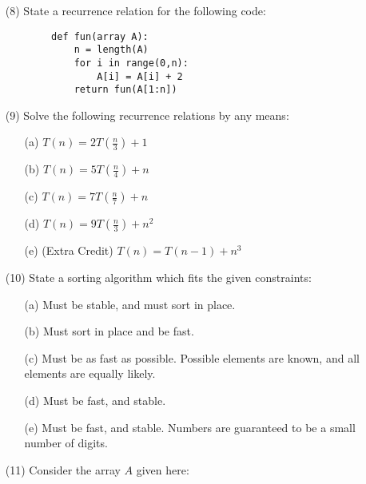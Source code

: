 \documentclass[12pt]{article}
\begin{document}
\begin{enumerate}
\begin{itemize}
        \end{itemize}
    \item[(8)] State a recurrence relation for the following code:
        \begin{lstlisting}
        def fun(array A):
            n = length(A)
            for i in range(0,n):
                A[i] = A[i] + 2
            return fun(A[1:n])
        \end{lstlisting}
    \newpage
    \item[(9)] Solve the following recurrence relations by any means:
    \begin{itemize}
        \item[(a)] $T(n) = 2T(\frac{n}{3}) + 1$ \vspace{4cm}
        \item[(b)] $T(n) = 5T(\frac{n}{4}) + n$ \vspace{4cm}
        \item[(c)] $T(n) = 7T(\frac{n}{7}) + n$ \vspace{4cm}
        \item[(d)] $T(n) = 9T(\frac{n}{3}) + n^2$ \vspace{4cm}
        \item[(e)] (Extra Credit) $T(n) = T(n-1) + n^3$ \vspace{4cm}
    \end{itemize}
    \newpage
    \item[(10)] State a sorting algorithm which fits the given constraints:
    \begin{itemize}
        \item[(a)] Must be stable, and must sort in place. \vspace{2cm}
        \item[(b)] Must sort in place and be fast. \vspace{2cm}
        \item[(c)] Must be as fast as possible. Possible elements are known, and all elements are equally likely. \vspace{2cm}
        \item[(d)] Must be fast, and stable. \vspace{2cm}
        \item[(e)] Must be fast, and stable. Numbers are guaranteed to be a small number of digits. \vspace{2cm}
    \end{itemize}
    \newpage
    \item[(11)] Consider the array $A$ given here:
    \begin{center}

\end{center}
\end{enumerate}
\end{document}
